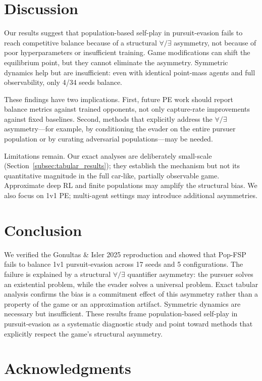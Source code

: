\documentclass[letterpaper, 10pt, journal]{IEEEtran}
\begin{document}
\section{Discussion}
\label{sec:discussion}

Our results suggest that population-based self-play in pursuit-evasion fails to reach competitive balance because of a structural $\forall/\exists$ asymmetry, not because of poor hyperparameters or insufficient training. Game modifications can shift the equilibrium point, but they cannot eliminate the asymmetry. Symmetric dynamics help but are insufficient: even with identical point-mass agents and full observability, only 4/34 seeds balance.

These findings have two implications. First, future PE work should report balance metrics against trained opponents, not only capture-rate improvements against fixed baselines. Second, methods that explicitly address the $\forall/\exists$ asymmetry---for example, by conditioning the evader on the entire pursuer population or by curating adversarial populations---may be needed.

Limitations remain. Our exact analyses are deliberately small-scale (Section~\ref{subsec:tabular_results}); they establish the mechanism but not its quantitative magnitude in the full car-like, partially observable game. Approximate deep RL and finite populations may amplify the structural bias. We also focus on 1v1 PE; multi-agent settings may introduce additional asymmetries.

\section{Conclusion}
\label{sec:conclusion}

We verified the Gonultas \& Isler 2025 reproduction and showed that Pop-FSP fails to balance 1v1 pursuit-evasion across 17 seeds and 5 configurations. The failure is explained by a structural $\forall/\exists$ quantifier asymmetry: the pursuer solves an existential problem, while the evader solves a universal problem. Exact tabular analysis confirms the bias is a commitment effect of this asymmetry rather than a property of the game or an approximation artifact. Symmetric dynamics are necessary but insufficient. These results frame population-based self-play in pursuit-evasion as a systematic diagnostic study and point toward methods that explicitly respect the game's structural asymmetry.

\section*{Acknowledgments}



\end{document}
